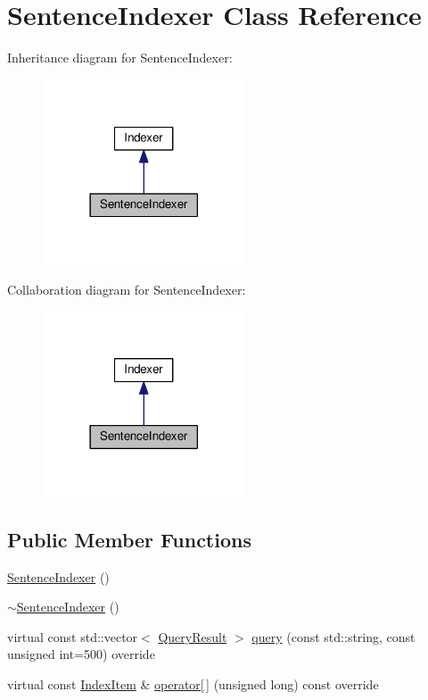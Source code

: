 \hypertarget{classSentenceIndexer}{}\section{Sentence\+Indexer Class Reference}
\label{classSentenceIndexer}


Inheritance diagram for Sentence\+Indexer\+:\nopagebreak
\begin{figure}[H]
\begin{center}
\leavevmode
\includegraphics[width=170pt]{classSentenceIndexer__inherit__graph}
\end{center}
\end{figure}


Collaboration diagram for Sentence\+Indexer\+:\nopagebreak
\begin{figure}[H]
\begin{center}
\leavevmode
\includegraphics[width=170pt]{classSentenceIndexer__coll__graph}
\end{center}
\end{figure}
\subsection*{Public Member Functions}
\begin{DoxyCompactItemize}
\item 
\hyperlink{classSentenceIndexer_a2ec9f359954191ebc5d84c759fd2238d}{Sentence\+Indexer} ()
\item 
\hyperlink{classSentenceIndexer_a3402eb910551128d0c8ecb33cf0bae42}{$\sim$\+Sentence\+Indexer} ()
\item 
virtual const std\+::vector$<$ \hyperlink{classQueryResult}{Query\+Result} $>$ \hyperlink{classSentenceIndexer_ac9b17bde40b851d8e0c263ce2241b9c4}{query} (const std\+::string, const unsigned int=500) override
\item 
virtual const \hyperlink{classIndexItem}{Index\+Item} \& \hyperlink{classSentenceIndexer_a0c0b7ee70c1d183e6bd6ca4ee412831c}{operator\mbox{[}$\,$\mbox{]}} (unsigned long) const override
\end{DoxyCompactItemize}
